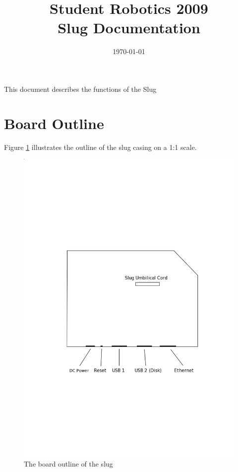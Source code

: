 \documentclass[a4paper, 12pt]{article}
\title {Student Robotics 2009\\ Slug Documentation}
\date{\today}
\begin{document}
\maketitle

\noindent This document describes the functions of the Slug

\section{Board Outline}

Figure \ref{slug-outline} illustrates the outline of the slug casing on a 1:1 scale.

\begin{figure}[ht]
\begin{center}
\includegraphics[keepaspectratio, scale=1, trim = 7cm 10cm 5cm 12cm]{./images/slugcase.png}
\caption{\label{slug-outline}The board outline of the slug}
\end{center}
\end{figure}
\end{document}
